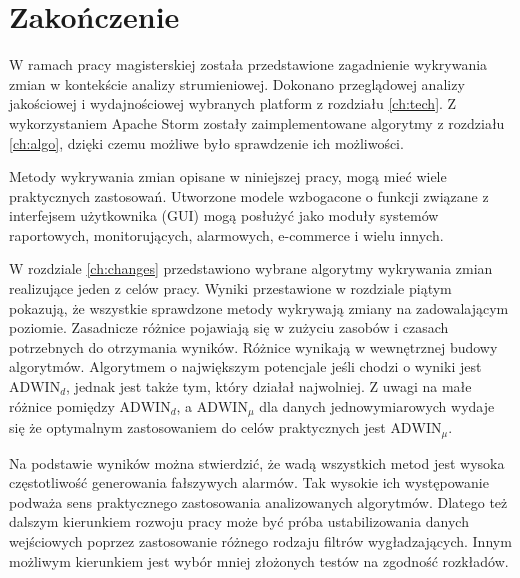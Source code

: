 \chapter{Zakończenie}
W ramach pracy magisterskiej została przedstawione zagadnienie wykrywania zmian w kontekście analizy strumieniowej.
Dokonano przeglądowej analizy jakościowej i wydajnościowej wybranych platform z rozdziału \ref{ch:tech}.
Z wykorzystaniem Apache Storm zostały zaimplementowane algorytmy z rozdziału \ref{ch:algo},
dzięki czemu możliwe było sprawdzenie ich możliwości.

Metody wykrywania zmian opisane w niniejszej pracy,
mogą mieć wiele praktycznych zastosowań.
Utworzone modele wzbogacone o funkcji związane z interfejsem użytkownika (GUI) mogą posłużyć
jako moduły systemów raportowych, monitorujących, alarmowych, e-commerce i wielu innych.

W rozdziale \ref{ch:changes} przedstawiono wybrane algorytmy wykrywania zmian realizujące jeden z celów pracy.
Wyniki przestawione w rozdziale piątym pokazują,
że wszystkie sprawdzone metody wykrywają zmiany na zadowalającym poziomie.
Zasadnicze różnice pojawiają się w zużyciu zasobów i czasach potrzebnych do otrzymania wyników.
Różnice wynikają w wewnętrznej budowy algorytmów.
Algorytmem o największym potencjale jeśli chodzi o wyniki jest $\mbox{ADWIN}_d$,
jednak jest także tym, który działał najwolniej.
Z uwagi na małe różnice pomiędzy $\mbox{ADWIN}_d$, a $\mbox{ADWIN}_\mu$ dla danych jednowymiarowych
wydaje się że optymalnym zastosowaniem do celów praktycznych jest $\mbox{ADWIN}_\mu$.

Na podstawie wyników można stwierdzić,
że wadą wszystkich metod jest wysoka częstotliwość generowania fałszywych alarmów.
Tak wysokie ich występowanie podważa sens praktycznego zastosowania analizowanych algorytmów.
Dlatego też dalszym kierunkiem rozwoju pracy może być próba ustabilizowania danych wejściowych
poprzez zastosowanie różnego rodzaju filtrów wygładzających.
Innym możliwym kierunkiem jest wybór mniej złożonych testów na zgodność rozkładów.
